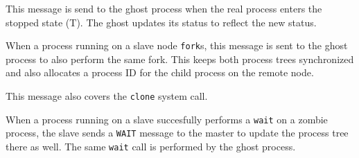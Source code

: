 \begin{description}
  \begin{reqresp}
  \noresponse
  \end{reqresp}


  This message is send to the ghost process when the real process
  enters the stopped state (T).  The ghost updates its status to
  reflect the new status.

  \begin{reqresp}
  \noresponse
  \end{reqresp}


   When a process running on a slave node \texttt{fork}s, this message
   is sent to the ghost process to also perform the same fork.  This
   keeps both process trees synchronized and also allocates a process
   ID for the child process on the remote node.

   This message also covers the \texttt{clone} system call.

   \begin{reqresp}
   \response
   \end{reqresp}


   When a process running on a slave succesfully performs a
   \texttt{wait} on a zombie process, the slave sends a \texttt{WAIT}
   message to the master to update the process tree there as well.
   The same \texttt{wait} call is performed by the ghost process.

   \begin{reqresp}
   \noresponse
   \end{reqresp}

\end{description}



